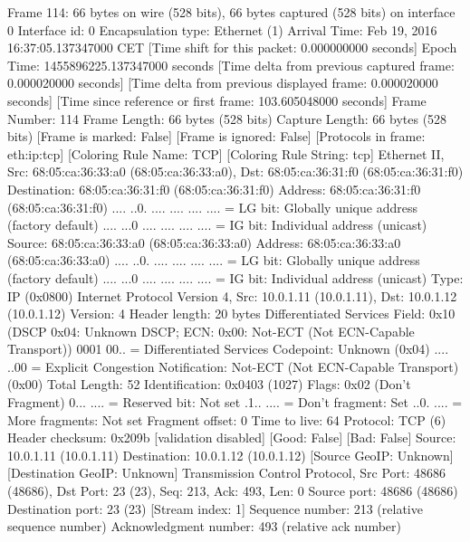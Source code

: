 Frame 114: 66 bytes on wire (528 bits), 66 bytes captured (528 bits) on interface 0
    Interface id: 0
    Encapsulation type: Ethernet (1)
    Arrival Time: Feb 19, 2016 16:37:05.137347000 CET
    [Time shift for this packet: 0.000000000 seconds]
    Epoch Time: 1455896225.137347000 seconds
    [Time delta from previous captured frame: 0.000020000 seconds]
    [Time delta from previous displayed frame: 0.000020000 seconds]
    [Time since reference or first frame: 103.605048000 seconds]
    Frame Number: 114
    Frame Length: 66 bytes (528 bits)
    Capture Length: 66 bytes (528 bits)
    [Frame is marked: False]
    [Frame is ignored: False]
    [Protocols in frame: eth:ip:tcp]
    [Coloring Rule Name: TCP]
    [Coloring Rule String: tcp]
Ethernet II, Src: 68:05:ca:36:33:a0 (68:05:ca:36:33:a0), Dst: 68:05:ca:36:31:f0 (68:05:ca:36:31:f0)
    Destination: 68:05:ca:36:31:f0 (68:05:ca:36:31:f0)
        Address: 68:05:ca:36:31:f0 (68:05:ca:36:31:f0)
        .... ..0. .... .... .... .... = LG bit: Globally unique address (factory default)
        .... ...0 .... .... .... .... = IG bit: Individual address (unicast)
    Source: 68:05:ca:36:33:a0 (68:05:ca:36:33:a0)
        Address: 68:05:ca:36:33:a0 (68:05:ca:36:33:a0)
        .... ..0. .... .... .... .... = LG bit: Globally unique address (factory default)
        .... ...0 .... .... .... .... = IG bit: Individual address (unicast)
    Type: IP (0x0800)
Internet Protocol Version 4, Src: 10.0.1.11 (10.0.1.11), Dst: 10.0.1.12 (10.0.1.12)
    Version: 4
    Header length: 20 bytes
    Differentiated Services Field: 0x10 (DSCP 0x04: Unknown DSCP; ECN: 0x00: Not-ECT (Not ECN-Capable Transport))
        0001 00.. = Differentiated Services Codepoint: Unknown (0x04)
        .... ..00 = Explicit Congestion Notification: Not-ECT (Not ECN-Capable Transport) (0x00)
    Total Length: 52
    Identification: 0x0403 (1027)
    Flags: 0x02 (Don't Fragment)
        0... .... = Reserved bit: Not set
        .1.. .... = Don't fragment: Set
        ..0. .... = More fragments: Not set
    Fragment offset: 0
    Time to live: 64
    Protocol: TCP (6)
    Header checksum: 0x209b [validation disabled]
        [Good: False]
        [Bad: False]
    Source: 10.0.1.11 (10.0.1.11)
    Destination: 10.0.1.12 (10.0.1.12)
    [Source GeoIP: Unknown]
    [Destination GeoIP: Unknown]
Transmission Control Protocol, Src Port: 48686 (48686), Dst Port: 23 (23), Seq: 213, Ack: 493, Len: 0
    Source port: 48686 (48686)
    Destination port: 23 (23)
    [Stream index: 1]
    Sequence number: 213    (relative sequence number)
    Acknowledgment number: 493    (relative ack number)
